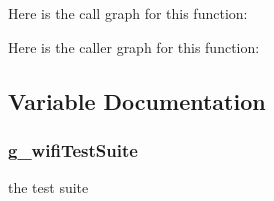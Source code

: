 Here is the call graph for this function\+:




Here is the caller graph for this function\+:




\subsection{Variable Documentation}
\subsubsection[{\texorpdfstring{g\+\_\+wifi\+Test\+Suite}{g_wifiTestSuite}}]{ g\+\_\+wifi\+Test\+Suite\hspace{0.3cm}{\ttfamily [static]}}\hypertarget{wifi-test_8cc_ab3719bc78f765a886d58e1307b3bc328}{}\label{wifi-test_8cc_ab3719bc78f765a886d58e1307b3bc328}


the test suite 

